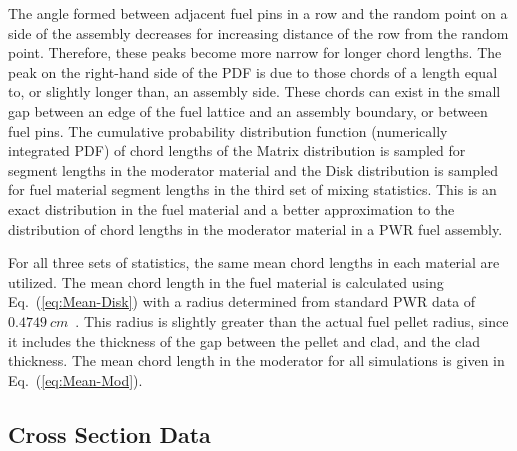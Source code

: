 \noindent
	\indent The angle formed between adjacent fuel pins in a row
	and the random point on a side of the assembly decreases for increasing distance of the row from the
	random point.  Therefore, these peaks become more narrow for longer chord lengths.  The peak on the
	right-hand side of the PDF is due to those chords of a length equal to, or slightly longer than,
	an assembly side.  These chords can exist in the small gap between an edge of the fuel lattice and 
	an assembly boundary, or between fuel pins.  The cumulative probability distribution function (numerically
	integrated PDF) of chord lengths of the Matrix distribution is sampled for segment lengths in the moderator
	material and the Disk distribution is sampled for fuel material segment lengths in the third set of mixing
	statistics.  This is an exact distribution in the fuel material and a better approximation to the distribution of
	chord lengths in the moderator material in a PWR fuel assembly.  
	
\noindent
	\indent For all three sets of statistics, the same mean chord lengths in each material are utilized.
	The mean chord length in the fuel material is calculated using Eq.~(\ref{eq:Mean-Disk}) with a radius 
	determined from standard PWR data of ${0.4749 \ cm}$~\cite{Dud:76}.  This radius is slightly greater
	than the actual fuel pellet radius, since it includes the thickness of the gap between the pellet and clad,
	and the clad thickness.  The mean chord length in the moderator for all simulations is given in
	Eq.~(\ref{eq:Mean-Mod}).  

\belowSubSecSkip

\subsection{Cross Section Data}
\label{sec:StochMedTrans-X-Sect}

